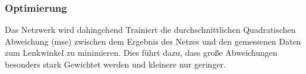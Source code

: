 \documentclass[a4paper, 12pt]{scrartcl}
\begin{document}
				\subsubsection{Optimierung}
				Das Netzwerk wird dahingehend Trainiert die durchschnittlichen Quadratischen Abweichung (mse) zwischen dem Ergebnis des Netzes und den gemessenen Daten zum Lenkwinkel zu minimieren. Dies führt dazu, dass große Abweichungen besonders stark Gewichtet werden und kleinere nur geringer. 
		
	
		
	
	
	\nocite{*}
	
\end{document}
